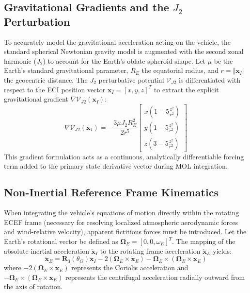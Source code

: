 \documentclass[11pt,a4paper]{article}
\theoremstyle{definition}
\numberwithin{equation}{section}
\begin{document}
\begin{appendices}
\subsection{Gravitational Gradients and the $J_2$ Perturbation}
To accurately model the gravitational acceleration acting on the vehicle, the standard spherical Newtonian gravity model is augmented with the second zonal harmonic ($J_2$) to account for the Earth's oblate spheroid shape. Let $\mu$ be the Earth's standard gravitational parameter, $R_E$ the equatorial radius, and $r = \Vert{}\mathbf{x}_I\Vert{}$ the geocentric distance. The $J_2$ perturbative potential $\mathcal{V}_{J2}$ is differentiated with respect to the ECI position vector $\mathbf{x}_I = [x, y, z]^T$ to extract the explicit gravitational gradient $\nabla \mathcal{V}_{J2}(\mathbf{x}_I)$:
\begin{equation}
    \nabla \mathcal{V}_{J2}(\mathbf{x}_I) = - \frac{3 \mu J_2 R_E^2}{2 r^5}
    \begin{bmatrix}
        x \left(1 - 5\frac{z^2}{r^2}\right) \\
        y \left(1 - 5\frac{z^2}{r^2}\right) \\
        z \left(3 - 5\frac{z^2}{r^2}\right)
    \end{bmatrix}
\end{equation}
This gradient formulation acts as a continuous, analytically differentiable forcing term added to the primary state derivative vector during MOL integration.

\subsection{Non-Inertial Reference Frame Kinematics}
When integrating the vehicle's equations of motion directly within the rotating ECEF frame (necessary for resolving localized atmospheric aerodynamic forces and wind-relative velocity), apparent fictitious forces must be introduced. Let the Earth's rotational vector be defined as $\boldsymbol{\Omega}_E = [0, 0, \omega_E]^T$. The mapping of the absolute inertial acceleration $\mathbf{\ddot{x}}_I$ to the rotating frame acceleration $\mathbf{\ddot{x}}_E$ yields:
\begin{equation}
    \mathbf{\ddot{x}}_E = \mathbf{R}_3(\theta_G) \mathbf{\ddot{x}}_I - 2(\boldsymbol{\Omega}_E \times \mathbf{\dot{x}}_E) - \boldsymbol{\Omega}_E \times (\boldsymbol{\Omega}_E \times \mathbf{x}_E)
\end{equation}
where $-2(\boldsymbol{\Omega}_E \times \mathbf{\dot{x}}_E)$ represents the Coriolis acceleration and $-\boldsymbol{\Omega}_E \times (\boldsymbol{\Omega}_E \times \mathbf{x}_E)$ represents the centrifugal acceleration radially outward from the axis of rotation.


\end{appendices}
\end{document}
